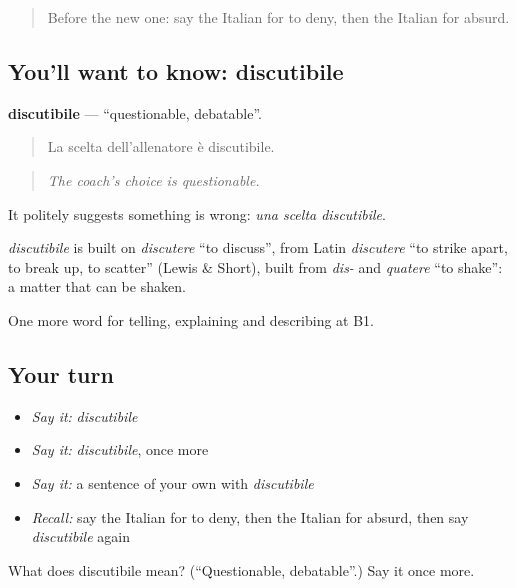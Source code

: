 \label{lesson:IT-C343-discutibile}



\begin{quote}
Before the new one: say the Italian for to deny, then the Italian for absurd.
\end{quote}

\subsection*{You'll want to know: discutibile}
\textbf{discutibile} — \textquotedblleft{}questionable, debatable\textquotedblright{}.

\begin{quote}
La scelta dell'allenatore è discutibile.
\end{quote}

\begin{quote}
\emph{The coach's choice is questionable.}
\end{quote}

It politely suggests something is wrong: \emph{una scelta discutibile}.

\begin{cousinweb}
\emph{discutibile} is built on \emph{discutere} \textquotedblleft{}to discuss\textquotedblright{}, from Latin \emph{discutere} \textquotedblleft{}to strike apart, to break up, to scatter\textquotedblright{} (Lewis \& Short), built from \emph{dis-} and \emph{quatere} \textquotedblleft{}to shake\textquotedblright{}: a matter that can be shaken.
\end{cousinweb}

\begin{grammarlens}[title={What you've built}]
One more word for telling, explaining and describing at B1.
\end{grammarlens}

\subsection*{Your turn}
\begin{itemize}
\raggedright
  \item \emph{Say it:} \emph{discutibile}
  \item \emph{Say it:} \emph{discutibile}, once more
  \item \emph{Say it:} a sentence of your own with \emph{discutibile}
  \item \emph{Recall:} say the Italian for to deny, then the Italian for absurd, then say \emph{discutibile} again
\end{itemize}

\begin{tcolorbox}[breakable,colback=teal!4,colframe=teal!35!black,title={Before you move on}]
What does discutibile mean? (\textquotedblleft{}Questionable, debatable\textquotedblright{}.) Say it once more.
\end{tcolorbox}
